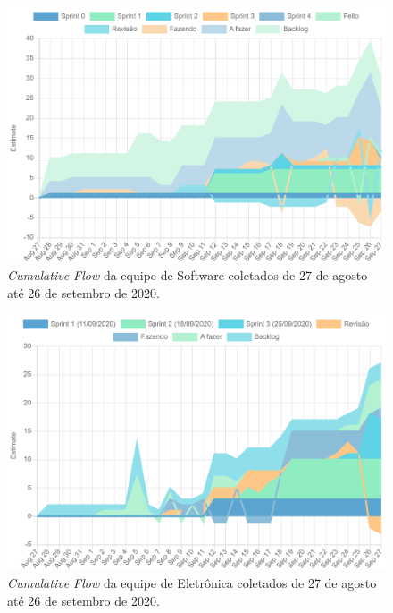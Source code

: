 \begin{figure}[H]
    \centering
  \includegraphics[scale=0.3]{figuras/cumulative_software.png}
  \caption{\textit{Cumulative Flow} da equipe de Software coletados de 27 de agosto até 26 de setembro de 2020.}
  \label{fig:cumulativesoftware}
\end{figure}
\begin{figure}[ht]
\centering
  \includegraphics[scale=0.3]{figuras/cumulative_eletronica.png}
  \caption{\textit{Cumulative Flow} da equipe de Eletrônica coletados de 27 de agosto até 26 de setembro de 2020.}
  \label{fig:cumulativeeletronica}
\end{figure}
